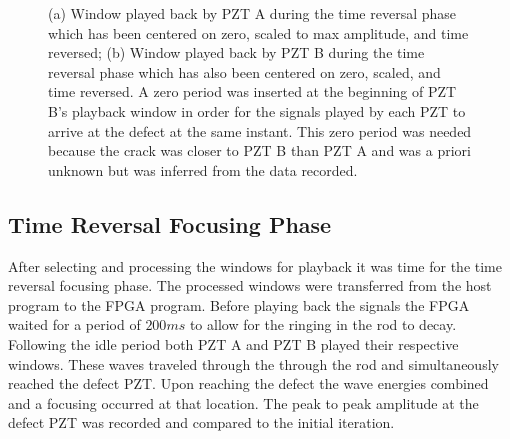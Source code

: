 \begin{figure}
\begin{subfigmatrix}{2}
\end{subfigmatrix}

  \caption
  { \label{fig:scaledSignals}
(a) Window played back by PZT A during the time reversal phase which has been centered on zero, scaled to max amplitude, and time reversed;
(b) Window played back by PZT B during the time reversal phase which has also been centered on zero, scaled, and time reversed. A zero period was inserted at the beginning of PZT B's playback window in order for the signals played by each PZT to arrive at the defect at the same instant. This zero period was needed because the crack was closer to PZT B than PZT A and was a priori unknown but was inferred from the data recorded.
}
\end{figure}

\subsection{Time Reversal Focusing Phase}
After selecting and processing the windows for playback it was time for the time reversal focusing phase. The processed windows were transferred from the host program to the FPGA program. Before playing back the signals the FPGA waited for a period of $200ms$ to allow for the ringing in the rod to decay. Following the idle period both PZT A and PZT B played their respective windows. These waves traveled through the through the rod and simultaneously reached the defect PZT. Upon reaching the defect the wave energies combined and a focusing occurred at that location. The peak to peak amplitude at the defect PZT was recorded and compared to the initial iteration.

